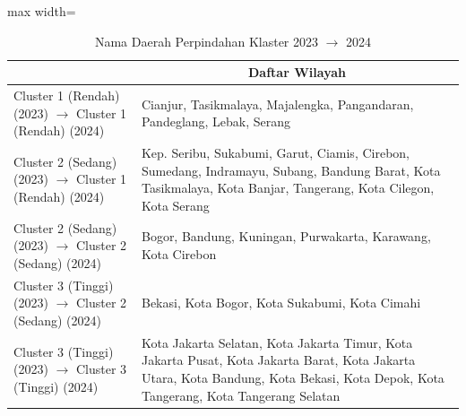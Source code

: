 \begin{table}[H]
\centering
\caption{Nama Daerah Perpindahan Klaster 2023 \(\rightarrow\) 2024} \label{tab:app1transname2023x2024}
\begin{adjustbox}{max width=\textwidth}
\begin{tabular}{|>{\centering\arraybackslash}p{4cm}|p{10cm}|}
\hline
\multicolumn{1}{|c|}{\textbf{Kategori}} & \multicolumn{1}{c|}{\textbf{Daftar Wilayah}} \\
\hline
Cluster 1 (Rendah) (2023) \(\rightarrow\) Cluster 1 (Rendah) (2024) & Cianjur, Tasikmalaya, Majalengka, Pangandaran, Pandeglang, Lebak, Serang \\
\hline
Cluster 2 (Sedang) (2023) \(\rightarrow\) Cluster 1 (Rendah) (2024) & Kep. Seribu, Sukabumi, Garut, Ciamis, Cirebon, Sumedang, Indramayu, Subang, Bandung Barat, Kota Tasikmalaya, Kota Banjar, Tangerang, Kota Cilegon, Kota Serang \\
\hline
Cluster 2 (Sedang) (2023) \(\rightarrow\) Cluster 2 (Sedang) (2024) & Bogor, Bandung, Kuningan, Purwakarta, Karawang, Kota Cirebon \\
\hline
Cluster 3 (Tinggi) (2023) \(\rightarrow\) Cluster 2 (Sedang) (2024) & Bekasi, Kota Bogor, Kota Sukabumi, Kota Cimahi \\
\hline
Cluster 3 (Tinggi) (2023) \(\rightarrow\) Cluster 3 (Tinggi) (2024) & Kota Jakarta Selatan, Kota Jakarta Timur, Kota Jakarta Pusat, Kota Jakarta Barat, Kota Jakarta Utara, Kota Bandung, Kota Bekasi, Kota Depok, Kota Tangerang, Kota Tangerang Selatan \\
\hline
\end{tabular}
\end{adjustbox}
\end{table}